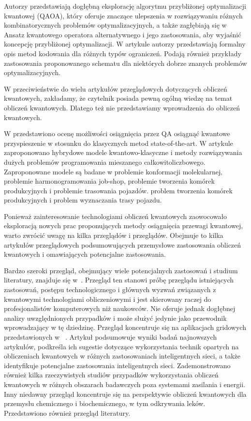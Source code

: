 \documentclass[a4paper,11pt]{article}
\begin{document}
Autorzy \cite{choi2019tutorial} przedstawiają dogłębną eksplorację algorytmu przybliżonej optymalizacji kwantowej (QAOA), który oferuje znaczące ulepszenia w rozwiązywaniu różnych kombinatorycznych problemów optymalizacyjnych, a także zagłębiają się w Ansatz kwantowego operatora alternatywnego i jego zastosowania, aby wyjaśnić koncepcję przybliżonej optymalizacji. W artykule \cite{ruan2023quantum} autorzy przedstawiają formalny opis metod kodowania dla różnych typów ograniczeń. Podają również przykłady zastosowania proponowanego schematu dla niektórych dobrze znanych problemów optymalizacyjnych.

W przeciwieństwie do wielu artykułów przeglądowych dotyczących obliczeń kwantowych, zakładamy, że czytelnik posiada pewną ogólną wiedzę na temat obliczeń kwantowych. Dlatego też nie przedstawiamy wprowadzenia do obliczeń kwantowych.

W \cite{crosson2021prospects} przedstawiono ocenę możliwości osiągnięcia przez QA osiągnąć kwantowe przyspieszenie w stosunku do klasycznych metod state-of-the-art. W artykule \cite{ajagekar2020quantum} zaproponowano hybrydowe modele kwantowo-klasyczne i metody rozwiązywania dużych problemów programowania mieszanego całkowitoliczbowego. Zaproponowane modele są badane w problemie konformacji molekularnej, problemie harmonogramowania job-shop, problemie tworzenia komórek produkcyjnych i problemie trasowania pojazdów.
problem tworzenia komórek produkcyjnych i problem wyznaczania trasy pojazdu.

Ponieważ zainteresowanie technologiami obliczeń kwantowych zaowocowało eksploracją nowych prac proponujących metody osiągnięcia przewagi kwantowej, warto zwrócić uwagę na kilka przeglądów i przeglądów. Obejmuje to kilka artykułów przeglądowych podsumowujących przemysłowe zastosowania obliczeń kwantowych i omawiających potencjalne zastosowania.

Bardzo szeroki przegląd, obejmujący wiele potencjalnych zastosowań i studium literatury, znajduje się w~\cite{singh2023contemporary}. Przegląd ten stanowi próbę przeglądu istniejących zastosowań, postępu technologicznego i głównych wyzwań związanych z kwantowymi technologiami obliczeniowymi i jest skierowany raczej do profesjonalistów komputerowych niż naukowców. Nie oferuje jednak dogłębnej analizy uwzględnionych przypadków i może służyć jedynie jako przewodnik wprowadzający w tę dziedzinę.
Przegląd koncentruje się na aplikacjach gridowych przedstawionych w ~\cite{ullah2022quantum}. Artykuł podsumowuje wyniki badań najnowszych artykułów, podkreśla ich sugestie dotyczące wykorzystania technik opartych na obliczeniach kwantowych w różnych zastosowaniach inteligentnych sieci, a także identyfikuje potencjalne zastosowania inteligentnych sieci. Zademonstrowano również kilka rzeczywistych studiów przypadków wykorzystania obliczeń kwantowych w różnych obszarach badawczych poza systemami zasilania i energii.
Inny niedawny przegląd \cite{nourbakhsh2022quantum} koncentruje się na perspektywie obliczeń kwantowych dla przemysłu chemicznego i biochemicznego, w tym odkrywania leków. Przedstawiono również przegląd literatury.
\end{document}
